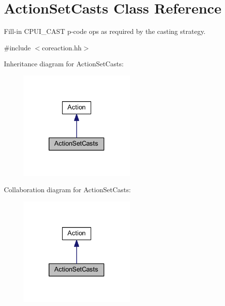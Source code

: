 \hypertarget{class_action_set_casts}{}\section{Action\+Set\+Casts Class Reference}
\label{class_action_set_casts}


Fill-\/in C\+P\+U\+I\+\_\+\+C\+A\+ST p-\/code ops as required by the casting strategy.  




{\ttfamily \#include $<$coreaction.\+hh$>$}



Inheritance diagram for Action\+Set\+Casts\+:
\nopagebreak
\begin{figure}[H]
\begin{center}
\leavevmode
\includegraphics[width=165pt]{class_action_set_casts__inherit__graph}
\end{center}
\end{figure}


Collaboration diagram for Action\+Set\+Casts\+:
\nopagebreak
\begin{figure}[H]
\begin{center}
\leavevmode
\includegraphics[width=165pt]{class_action_set_casts__coll__graph}
\end{center}
\end{figure}
